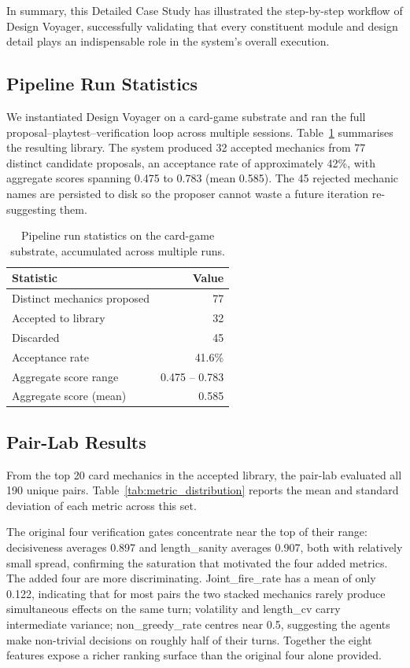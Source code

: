 \documentclass[conference]{IEEEtran}
\begin{document}
In summary, this Detailed Case Study has illustrated the step-by-step workflow of Design Voyager, successfully validating that every constituent module and design detail plays an indispensable role in the system's overall execution.

\subsection{Pipeline Run Statistics}

We instantiated Design Voyager on a card-game substrate and ran the full proposal--playtest--verification loop across multiple sessions. Table~\ref{tab:pipeline_stats} summarises the resulting library. The system produced 32 accepted mechanics from 77 distinct candidate proposals, an acceptance rate of approximately 42\%, with aggregate scores spanning 0.475 to 0.783 (mean 0.585). The 45 rejected mechanic names are persisted to disk so the proposer cannot waste a future iteration re-suggesting them.

\begin{table}[ht!]
\centering
\caption{Pipeline run statistics on the card-game substrate, accumulated across multiple runs.}
\label{tab:pipeline_stats}
\begin{tabular}{|l|r|}
\hline
\textbf{Statistic} & \textbf{Value} \\
\hline
Distinct mechanics proposed & 77 \\
\hline
Accepted to library & 32 \\
\hline
Discarded & 45 \\
\hline
Acceptance rate & 41.6\% \\
\hline
Aggregate score range & 0.475 -- 0.783 \\
\hline
Aggregate score (mean) & 0.585 \\
\hline
\end{tabular}
\end{table}

\subsection{Pair-Lab Results}

From the top 20 card mechanics in the accepted library, the pair-lab evaluated all 190 unique pairs. Table~\ref{tab:metric_distribution} reports the mean and standard deviation of each metric across this set.

The original four verification gates concentrate near the top of their range: decisiveness averages 0.897 and length\_sanity averages 0.907, both with relatively small spread, confirming the saturation that motivated the four added metrics. The added four are more discriminating. Joint\_fire\_rate has a mean of only 0.122, indicating that for most pairs the two stacked mechanics rarely produce simultaneous effects on the same turn; volatility and length\_cv carry intermediate variance; non\_greedy\_rate centres near 0.5, suggesting the agents make non-trivial decisions on roughly half of their turns. Together the eight features expose a richer ranking surface than the original four alone provided.
\end{document}
